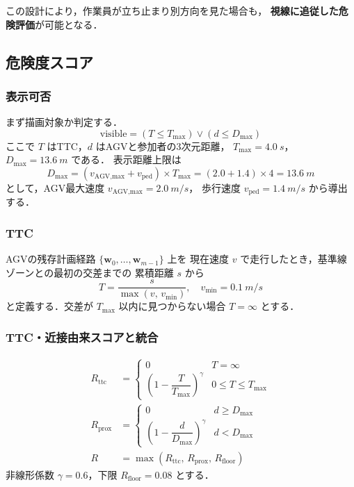 この設計により，作業員が立ち止まり別方向を見た場合も，
\textbf{視線に追従した危険評価}が可能となる．

\subsection{危険度スコア}

\subsubsection{表示可否}

まず描画対象か判定する．
\begin{equation}
  \text{visible} = (T \le T_\text{max}) \vee (d \le D_\text{max})
\end{equation}
ここで $T$ はTTC，$d$ はAGVと参加者の3次元距離，
$T_\text{max}=\SI{4.0}{s}$，$D_\text{max}=\SI{13.6}{m}$ である．
表示距離上限は
\begin{equation}
  D_\text{max} = (v_\text{AGV,max} + v_\text{ped}) \times T_\text{max}
  = (2.0 + 1.4) \times 4 = \SI{13.6}{m}
\end{equation}
として，AGV最大速度 $v_\text{AGV,max}=\SI{2.0}{m/s}$，
歩行速度 $v_\text{ped}=\SI{1.4}{m/s}$ から導出する．

\subsubsection{TTC}

AGVの残存計画経路 $\{\mathbf{w}_0,\ldots,\mathbf{w}_{m-1}\}$ 上を
現在速度 $v$ で走行したとき，基準線ゾーンとの最初の交差までの
累積距離 $s$ から
\begin{equation}
  T = \frac{s}{\max(v,\, v_\text{min})}, \quad v_\text{min}=\SI{0.1}{m/s}
\end{equation}
と定義する．交差が $T_\text{max}$ 以内に見つからない場合 $T=\infty$ とする．

\subsubsection{TTC・近接由来スコアと統合}

\begin{align}
  R_\text{ttc} &=
  \begin{cases}
    0 & T = \infty \\
    \left(1 - \dfrac{T}{T_\text{max}}\right)^{\gamma} & 0 \le T \le T_\text{max}
  \end{cases} \\[6pt]
  R_\text{prox} &=
  \begin{cases}
    0 & d \ge D_\text{max} \\
    \left(1 - \dfrac{d}{D_\text{max}}\right)^{\gamma} & d < D_\text{max}
  \end{cases} \\[6pt]
  R &= \max(R_\text{ttc},\, R_\text{prox},\, R_\text{floor})
\end{align}
非線形係数 $\gamma=0.6$，下限 $R_\text{floor}=0.08$ とする．

